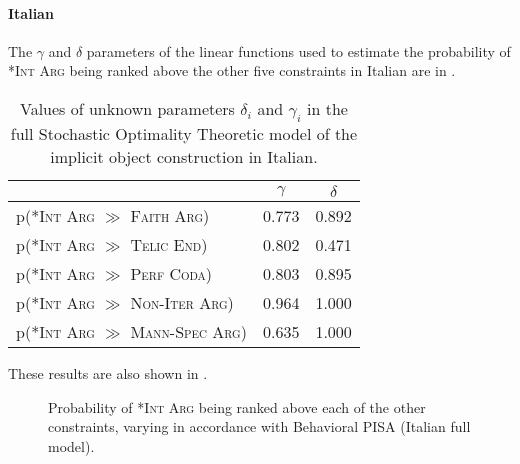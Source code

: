 \paragraph{Italian} 
The $\gamma$ and $\delta$ parameters of the linear functions used to estimate the probability of \textsc{*Int Arg} being ranked above the other five constraints in Italian are in .

\begin{table}[htb] %
\caption{Values of unknown parameters $\delta_i$ and $\gamma_i$ in the full Stochastic Optimality Theoretic model of the implicit object construction in Italian.}
\begin{tabular}{l|cc}
                                                                                & $\gamma$ & $\delta$ \\
                                                                                \hline
p(\textsc{*Int Arg} $\gg$ \textsc{Faith Arg}) & 0.773        & 0.892        \\
p(\textsc{*Int Arg} $\gg$ \textsc{Telic End}) & 0.802        & 0.471        \\
p(\textsc{*Int Arg} $\gg$ \textsc{Perf Coda})  & 0.803        & 0.895        \\
p(\textsc{*Int Arg} $\gg$ \textsc{Non-Iter Arg}) & 0.964        & 1.000        \\
p(\textsc{*Int Arg} $\gg$ \textsc{Mann-Spec Arg}) & 0.635        & 1.000       
\end{tabular}
\end{table}

These results are also shown in .

\begin{figure}[htb]
\caption{Probability of \textsc{*Int Arg} being ranked above each of the other constraints, varying in accordance with Behavioral PISA (Italian full model).}
    
\end{figure}

